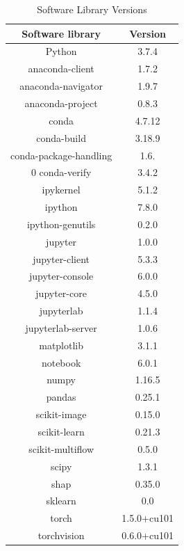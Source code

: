 \documentclass[conference]{IEEEtran}
\begin{document}
\begin{table}[htbp]
\caption{Software Library Versions}
\begin{center}
\begin{tabular}{|c|c|}
	\hline
	\textbf{Software library} & \textbf{Version} \\
	\hline
	Python & 3.7.4\\ \hline
	anaconda-client & 1.7.2 \\ \hline
	anaconda-navigator & 1.9.7 \\ \hline
	anaconda-project & 0.8.3\\ \hline
	conda & 4.7.12\\ \hline
	conda-build & 3.18.9\\ \hline
	conda-package-handling & 1.6.\\ \hline0
	conda-verify & 3.4.2\\ \hline
	ipykernel & 5.1.2\\ \hline
	ipython & 7.8.0\\ \hline
	ipython-genutils & 0.2.0\\ \hline
	jupyter & 1.0.0\\ \hline
	jupyter-client & 5.3.3\\ \hline
	jupyter-console & 6.0.0\\ \hline
	jupyter-core & 4.5.0\\ \hline
	jupyterlab & 1.1.4\\ \hline
	jupyterlab-server & 1.0.6\\ \hline
	matplotlib & 3.1.1\\ \hline
	notebook & 6.0.1\\ \hline
	numpy & 1.16.5\\ \hline
	pandas & 0.25.1\\ \hline
	scikit-image & 0.15.0\\ \hline
	scikit-learn & 0.21.3\\ \hline
	scikit-multiflow & 0.5.0\\ \hline                 
	scipy & 1.3.1\\ \hline
	shap & 0.35.0\\ \hline
	sklearn & 0.0\\ \hline
	torch & 1.5.0+cu101\\ \hline
	torchvision & 0.6.0+cu101  \\ \hline
	
\end{tabular}
\label{softwareVersion}
\end{center}
\end{table}
\end{document}
